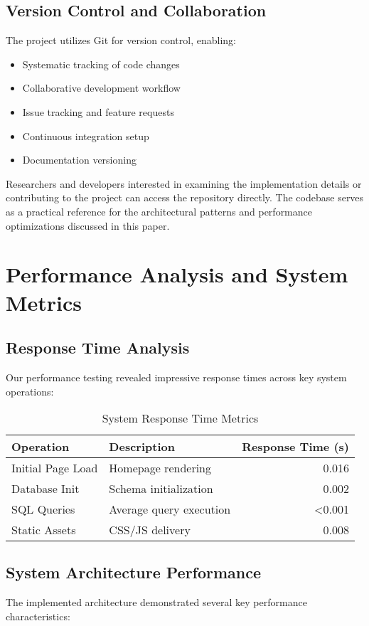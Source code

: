 \documentclass{article}
\begin{document}
\subsection{Version Control and Collaboration}
The project utilizes Git for version control, enabling:

\begin{itemize}
    \item Systematic tracking of code changes
    \item Collaborative development workflow
    \item Issue tracking and feature requests
    \item Continuous integration setup
    \item Documentation versioning
\end{itemize}

Researchers and developers interested in examining the implementation details or contributing to the project can access the repository directly. The codebase serves as a practical reference for the architectural patterns and performance optimizations discussed in this paper.

\section{Performance Analysis and System Metrics}

\subsection{Response Time Analysis}
Our performance testing revealed impressive response times across key system operations:

\begin{table}[h]
\centering
\caption{System Response Time Metrics}
\begin{tabular}{@{}llr@{}}
\toprule
Operation & Description & Response Time (s) \\
\midrule
Initial Page Load & Homepage rendering & 0.016 \\
Database Init & Schema initialization & 0.002 \\
SQL Queries & Average query execution & <0.001 \\
Static Assets & CSS/JS delivery & 0.008 \\
\bottomrule
\end{tabular}
\end{table}

\subsection{System Architecture Performance}
The implemented architecture demonstrated several key performance characteristics:
\end{document}
